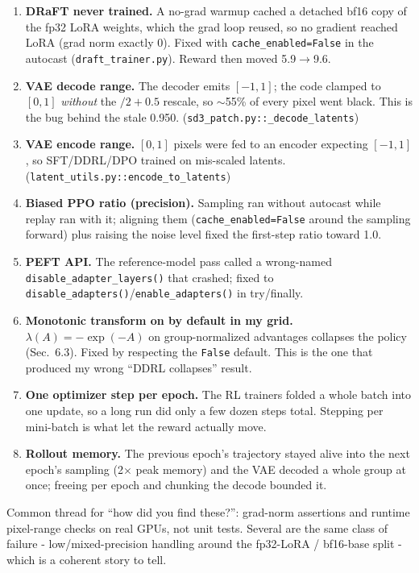\documentclass[11pt]{article}
\newcommand{\code}[1]{\texttt{\small #1}}
\begin{document}
\begin{enumerate}
\item \textbf{DRaFT never trained.} A no-grad warmup cached a detached bf16 copy of the
fp32 LoRA weights, which the grad loop reused, so no gradient reached LoRA (grad norm
exactly 0). Fixed with \code{cache\_enabled=False} in the autocast
(\code{draft\_trainer.py}). Reward then moved 5.9$\to$9.6.
\item \textbf{VAE decode range.} The decoder emits $[-1,1]$; the code clamped to
$[0,1]$ \textit{without} the $/2+0.5$ rescale, so $\sim$55\% of every pixel went black.
This is the bug behind the stale 0.950. (\code{sd3\_patch.py::\_decode\_latents})
\item \textbf{VAE encode range.} $[0,1]$ pixels were fed to an encoder expecting
$[-1,1]$, so SFT/DDRL/DPO trained on mis-scaled latents.
(\code{latent\_utils.py::encode\_to\_latents})
\item \textbf{Biased PPO ratio (precision).} Sampling ran without autocast while replay
ran with it; aligning them (\code{cache\_enabled=False} around the sampling forward)
plus raising the noise level fixed the first-step ratio toward 1.0.
\item \textbf{PEFT API.} The reference-model pass called a wrong-named
\code{disable\_adapter\_layers()} that crashed; fixed to
\code{disable\_adapters()}/\code{enable\_adapters()} in try/finally.
\item \textbf{Monotonic transform on by default in my grid.} $\lambda(A)=-\exp(-A)$ on
group-normalized advantages collapses the policy (Sec.~6.3). Fixed by respecting the
\code{False} default. This is the one that produced my wrong ``DDRL collapses'' result.
\item \textbf{One optimizer step per epoch.} The RL trainers folded a whole batch into
one update, so a long run did only a few dozen steps total. Stepping per mini-batch is
what let the reward actually move.
\item \textbf{Rollout memory.} The previous epoch's trajectory stayed alive into the
next epoch's sampling (2$\times$ peak memory) and the VAE decoded a whole group at once;
freeing per epoch and chunking the decode bounded it.
\end{enumerate}
Common thread for ``how did you find these?'': grad-norm assertions and runtime
pixel-range checks on real GPUs, not unit tests. Several are the same class of failure -
low/mixed-precision handling around the fp32-LoRA / bf16-base split - which is a coherent
story to tell.
\end{document}

